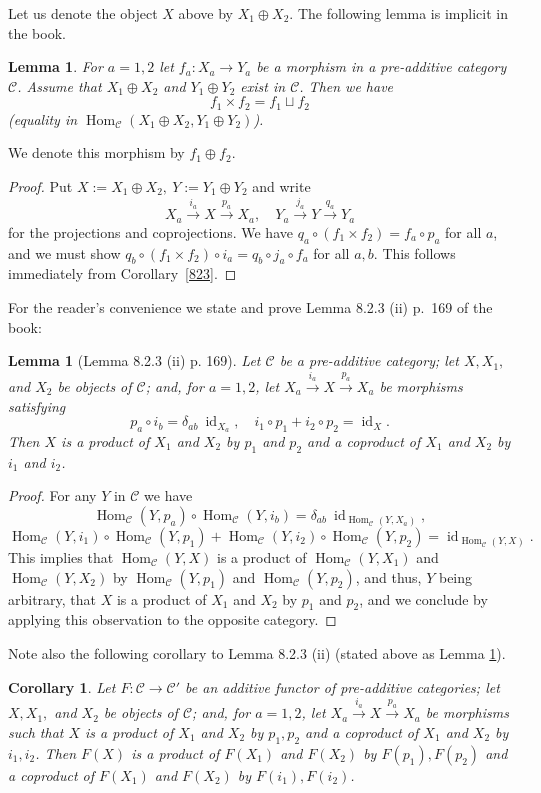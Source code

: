 \documentclass[12pt]{article}
\newtheorem{lem}[thm]{Lemma}
\newtheorem{cor}[thm]{Corollary}
\theoremstyle{remark}
\theoremstyle{definition}
\newcommand{\C}{\mathcal C}
\newcommand{\xr}{\xrightarrow}
\DeclareMathOperator{\id}{id}
\DeclareMathOperator{\Hom}{Hom}
\begin{document}
Let us denote the object $X$ above by $X_1\oplus X_2$. The following lemma is implicit in the book. 

\begin{lem}
For $a=1,2$ let $f_a:X_a\to Y_a$ be a morphism in a pre-additive category $\C$. Assume that $X_1\oplus X_2$ and $Y_1\oplus Y_2$ exist in $\C$. Then we have 
$$
f_1\times f_2=f_1\sqcup f_2
$$ 
(equality in $\Hom_\C(X_1\oplus X_2,Y_1\oplus Y_2)$). 
\end{lem} 

We denote this morphism by $f_1\oplus f_2$.\medskip 

\begin{proof}
Put $X:=X_1\oplus X_2,\ Y:=Y_1\oplus Y_2$ and write 
$$
X_a\xr{i_a}X\xr{p_a}X_a,\quad Y_a\xr{j_a}Y\xr{q_a}Y_a
$$ 
for the projections and coprojections. We have $q_a\circ(f_1\times f_2)=f_a\circ p_a$ for all $a$, and we must show $q_b\circ (f_1\times f_2)\circ i_a=q_b\circ j_a\circ f_a$ for all $a,b$. This follows immediately from Corollary~\ref{823}.
\end{proof}

For the reader's convenience we state and prove Lemma 8.2.3 (ii) p.~169 of the book:

\begin{lem}[Lemma 8.2.3 (ii) p. 169]\label{823ii}
Let $\C$ be a pre-additive category; let $X,X_1,$ and $X_2$ be objects of $\C$; and, for $a=1,2$, let $X_a\xr{i_a}X\xr{p_a}X_a$ be morphisms satisfying 
$$
p_a\circ i_b=\delta_{ab}\ \id_{X_a},\quad i_1\circ p_1+i_2\circ p_2=\id_X.
$$
Then $X$ is a product of $X_1$ and $X_2$ by $p_1$ and $p_2$ and a coproduct of $X_1$ and $X_2$ by $i_1$ and $i_2$. 
\end{lem}

\begin{proof}
For any $Y$ in $\C$ we have 
$$
\Hom_\C(Y,p_a)\circ\Hom_\C(Y,i_b)=\delta_{ab}\ \id_{\Hom_\C(Y,X_a)},
$$ 
$$
\Hom_\C(Y,i_1)\circ\Hom_\C(Y,p_1)+\Hom_\C(Y,i_2)\circ\Hom_\C(Y,p_2)=\id_{\Hom_\C(Y,X)}.
$$ 
This implies that $\Hom_\C(Y,X)$ is a product of $\Hom_\C(Y,X_1)$ and $\Hom_\C(Y,X_2)$ by $\Hom_\C(Y,p_1)$ and $\Hom_\C(Y,p_2)$, and thus, $Y$ being arbitrary, that $X$ is a product of $X_1$ and $X_2$ by $p_1$ and $p_2$, and we conclude by applying this observation to the opposite category.
\end{proof}

Note also the following corollary to Lemma 8.2.3 (ii) (stated above as Lemma \ref{823ii}). 

\begin{cor}\label{823b}
Let $F:\C\to\C'$ be an additive functor of pre-additive categories; let $X,X_1,$ and $X_2$ be objects of $\C$; and, for $a=1,2$, let $X_a\xr{i_a}X\xr{p_a}X_a$ be morphisms such that $X$ is a product of $X_1$ and $X_2$ by $p_1,p_2$ and a coproduct of $X_1$ and $X_2$ by $i_1,i_2$. Then $F(X)$ is a product of $F(X_1)$ and $F(X_2)$ by $F(p_1),F(p_2)$ and a coproduct of $F(X_1)$ and $F(X_2)$ by $F(i_1),F(i_2)$. 
\end{cor}
\end{document}
